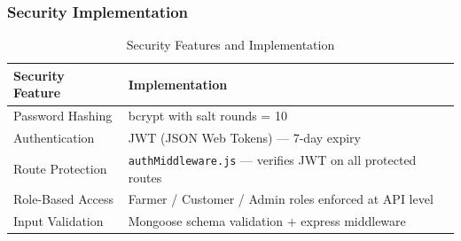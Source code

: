 \subsubsection{Security Implementation}

\begin{table}[ht]
\centering
\caption{Security Features and Implementation}
\label{tab:security}
\begin{tabular}{|p{4cm}|p{9cm}|}
\hline
\textbf{Security Feature} & \textbf{Implementation} \\
\hline
Password Hashing & bcrypt with salt rounds = 10 \\
Authentication & JWT (JSON Web Tokens) --- 7-day expiry \\
Route Protection & \texttt{authMiddleware.js} --- verifies JWT on all protected routes \\
Role-Based Access & Farmer / Customer / Admin roles enforced at API level \\
Input Validation & Mongoose schema validation + express middleware \\
\hline
\end{tabular}
\end{table}
